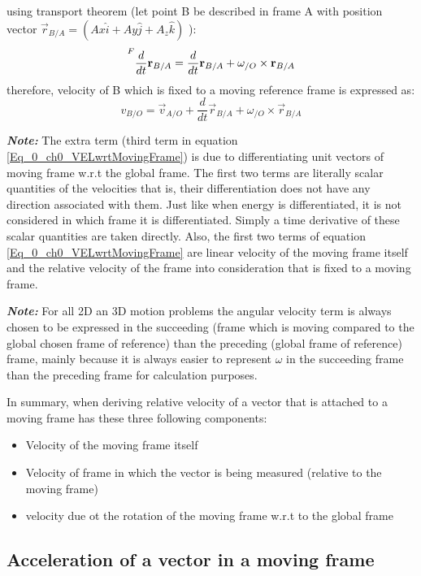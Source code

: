using transport theorem (let point B be described in frame A with position vector $\vec{r}_{B/A} = (Ax \hat{i} + Ay \hat{j} + A_z \hat{k})$ ):
\begin{equation*}
	\prescript{F}{}{\frac{d}{dt}\vec{r}_{B/A}} = \frac{d}{dt}\vec{r}_{B/A} + \omega_{/O} \times \vec{r}_{B/A}
\end{equation*}
therefore, velocity of B which is fixed to a moving reference frame is expressed as:
\begin{equation} \label{Eq_0_ch0_VELwrtMovingFrame}
	v_{B/O} = \vec{v}_{A/O} + \frac{d}{dt}\vec{r}_{B/A} + \omega_{/O} \times \vec{r}_{B/A}
\end{equation}

\textbf{\textit{Note: }}The extra term (third term in equation \eqref{Eq_0_ch0_VELwrtMovingFrame}) is due to differentiating unit vectors of moving frame w.r.t the global frame. The first two terms are literally scalar quantities of the velocities that is, their differentiation does not have any direction associated with them. Just like when energy is differentiated, it is not considered in which frame it is differentiated. Simply a time derivative of these scalar quantities are taken directly. Also, the first two terms of equation \eqref{Eq_0_ch0_VELwrtMovingFrame} are linear velocity of the moving frame itself and the relative velocity of the frame into consideration that is fixed to a moving frame.

\textbf{\textit{Note: }} For all 2D an 3D motion problems the angular velocity term is always chosen to be expressed in the succeeding (frame which is moving compared to the global chosen frame of reference) than the preceding (global frame of reference) frame, mainly because it is always easier to represent $\omega$ in the succeeding frame than the preceding frame for calculation purposes.

In summary, when deriving relative velocity of a vector that is attached to a moving frame has these three following components:
\begin{itemize}
	\item Velocity of the moving frame itself
	\item Velocity of frame in which the vector is being measured (relative to the moving frame)
	\item velocity due ot the rotation of the moving frame w.r.t to the global frame
\end{itemize}

\subsection{Acceleration of a vector in a moving frame}


